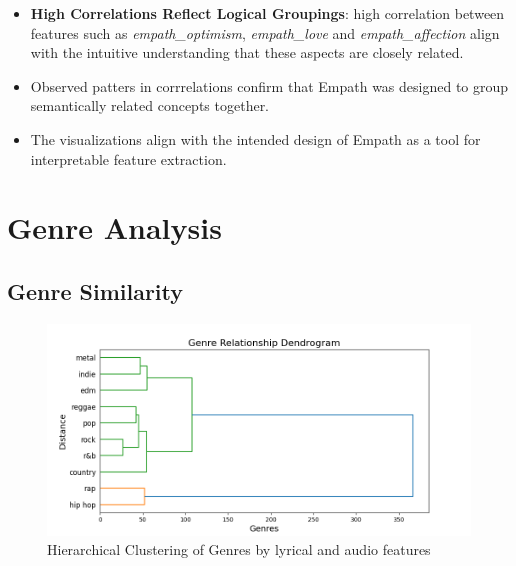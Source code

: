 \begin{itemize}
  \item \textbf{High Correlations Reflect Logical Groupings}: high correlation
    between features such as \textit{empath\_optimism}, \textit{empath\_love} and
    \textit{empath\_affection} align with the intuitive understanding that
    these aspects are closely related.
  \item Observed patters in corrrelations confirm that Empath was designed to
    group semantically related concepts together.
  \item The visualizations align with the intended design of Empath as a tool
    for interpretable feature  extraction.
\end{itemize}



\section{Genre Analysis}

\subsection{Genre Similarity}

\begin{center}
\begin{figure}[H]
  \centering
  \includegraphics[width=5in]{img/genres_dendrogram.png}
  \caption{Hierarchical Clustering of Genres by lyrical and audio features}
  \label{Figure:dendrogram_spotify_features}
\end{figure}
\end{center}

